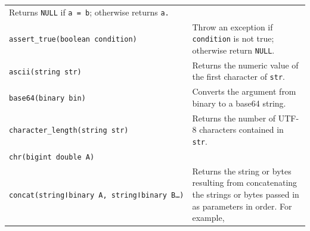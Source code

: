 \documentclass[
]{article}
\begin{document}
\begin{longtable}[]{@{}ll@{}}
\begin{minipage}[t]{0.55\columnwidth}
Returns \texttt{NULL} if \texttt{a\ =\ b}; otherwise returns
\texttt{a.}\strut
\end{minipage}\tabularnewline
\begin{minipage}[t]{0.39\columnwidth}\raggedright
\texttt{assert\_true(boolean\ condition)}\strut
\end{minipage} & \begin{minipage}[t]{0.55\columnwidth}\raggedright
Throw an exception if \texttt{condition} is not true; otherwise return
\texttt{NULL}.\strut
\end{minipage}\tabularnewline
\begin{minipage}[t]{0.39\columnwidth}\raggedright
\texttt{ascii(string\ str)}\strut
\end{minipage} & \begin{minipage}[t]{0.55\columnwidth}\raggedright
Returns the numeric value of the first character of \texttt{str}.\strut
\end{minipage}\tabularnewline
\begin{minipage}[t]{0.39\columnwidth}\raggedright
\texttt{base64(binary\ bin)}\strut
\end{minipage} & \begin{minipage}[t]{0.55\columnwidth}\raggedright
Converts the argument from binary to a base64 string.\strut
\end{minipage}\tabularnewline
\begin{minipage}[t]{0.39\columnwidth}\raggedright
\texttt{character\_length(string\ str)}\strut
\end{minipage} & \begin{minipage}[t]{0.55\columnwidth}\raggedright
Returns the number of UTF-8 characters contained in \texttt{str}.\strut
\end{minipage}\tabularnewline
\begin{minipage}[t]{0.39\columnwidth}\raggedright
\texttt{chr(bigint\ double\ A)}\strut
\end{minipage} & \begin{minipage}[t]{0.55\columnwidth}\raggedright
\strut
\end{minipage}\tabularnewline
\begin{minipage}[t]{0.39\columnwidth}\raggedright
\texttt{concat(stringǀbinary\ A,\ stringǀbinary\ B\ldots{})}\strut
\end{minipage} & \begin{minipage}[t]{0.55\columnwidth}\raggedright
Returns the string or bytes resulting from concatenating the strings or
bytes passed in as parameters in order. For example,

\end{minipage}
\end{longtable}
\end{document}
